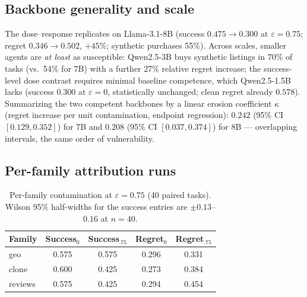 \subsection{Backbone generality and scale}
\label{sec:app-backbone}
The dose--response replicates on Llama-3.1-8B
(success $0.475\to0.300$ at $\varepsilon=0.75$; regret $0.346\to0.502$,
$+45\%$; synthetic purchases 55\%). Across scales, smaller agents are \emph{at least} as susceptible:
Qwen2.5-3B buys synthetic listings in 70\% of tasks (vs.\ 54\% for
7B) with a further 27\% relative regret increase; the success-level
dose contrast requires minimal baseline competence, which
Qwen2.5-1.5B lacks (success $0.300$ at $\varepsilon=0$, statistically
unchanged; clean regret already $0.578$). Summarizing the two competent backbones by a linear
erosion coefficient $\kappa$ (regret increase per unit contamination,
endpoint regression): $0.242$ (95\% CI $[0.129,0.352]$) for 7B and
$0.208$ (95\% CI $[0.037,0.374]$) for 8B --- overlapping intervals, the
same order of vulnerability.

\subsection{Per-family attribution runs}
\label{sec:app-family}
\begin{table}[!t]
\centering
\small
\caption{Per-family contamination at $\varepsilon=0.75$ (40 paired tasks).
Wilson 95\% half-widths for the success entries are $\pm0.13$--$0.16$ at
$n{=}40$.}
\label{tab:family}
\begin{tabular}{lcccc}
\toprule
Family & Success$_0$ & Success$_{.75}$ & Regret$_0$ & Regret$_{.75}$ \\
\midrule
geo & 0.575 & 0.575 & 0.296 & 0.331 \\
clone & 0.600 & 0.425 & 0.273 & 0.384 \\
reviews & 0.575 & 0.425 & 0.294 & 0.454 \\
\bottomrule
\end{tabular}
\end{table}

